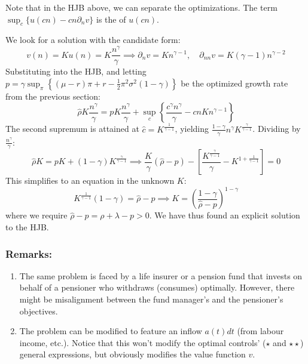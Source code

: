 Note that in the HJB above, we can separate the optimizations. The term $\sup_c \{ u(cn) - cn \partial_n v \}$ is the  of $u(cn)$.

We look for a solution with the candidate form:
\begin{equation*}
    v(n) = K u(n) = K \frac{n^\gamma}{\gamma} \implies \partial_n v = K n^{\gamma-1}, \quad \partial_{nn} v = K(\gamma - 1) n^{\gamma-2}
\end{equation*}
Substituting into the HJB, and letting $p = \gamma \sup_\pi \left\{ (\mu-r)\pi + r - \frac{1}{2} \pi^2 \sigma^2 (1-\gamma) \right\}$ be the optimized growth rate from the previous section:
\begin{equation*}
    \hat{\rho} K \frac{n^\gamma}{\gamma} = p K \frac{n^\gamma}{\gamma} + \sup_c \left\{ \frac{c^\gamma n^\gamma}{\gamma} - cn K n^{\gamma-1} \right\}
\end{equation*}
The second supremum is attained at $\hat{c} = K^{\frac{1}{\gamma-1}}$, yielding $\frac{1-\gamma}{\gamma} n^\gamma K^{\frac{\gamma}{\gamma-1}}$. Dividing by $\frac{n^\gamma}{\gamma}$:
\begin{equation*}
    \hat{\rho} K = p K + (1-\gamma) K^{\frac{\gamma}{\gamma-1}} \implies \frac{K}{\gamma} (\hat{\rho} - p) - \left[ \frac{K^{\frac{\gamma}{\gamma-1}}}{\gamma} - K^{1 + \frac{1}{\gamma-1}} \right] = 0
\end{equation*}
This simplifies to an equation in the unknown $K$:
\begin{equation*}
    K^{\frac{1}{\gamma-1}} (1-\gamma) = \hat{\rho} - p \implies K = \left( \frac{1-\gamma}{\hat{\rho} - p} \right)^{1-\gamma}
\end{equation*}
where we require $\hat{\rho} - p = \rho + \lambda - p > 0$. We have thus found an explicit solution to the HJB.

\subsubsection*{Remarks:}
\begin{enumerate}
    \item The same problem is faced by a life insurer or a pension fund that invests on behalf of a pensioner who withdraws (consumes) optimally. However, there might be misalignment between the fund manager's and the pensioner's objectives.
    \item The problem can be modified to feature an inflow $a(t)dt$ (from labour income, etc.). Notice that this won't modify the optimal controls' ($\star$ and $\star\star$) general expressions, but obviously modifies the value function $v$.
\end{enumerate}

